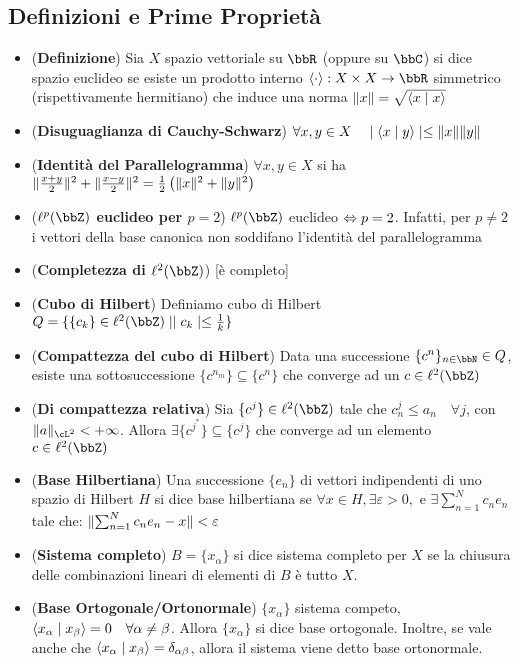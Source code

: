 \documentclass[a4paper,NoNotes,GeneralMath]{stdmdoc}
\newcommand{\cl}{\ell}
\begin{document}
        \subsection*{Definizioni e Prime Proprietà}
        \begin{itemize}
        \item ({\bf Definizione}) Sia $X$ spazio vettoriale su $\bbR$ (oppure su $\bbC$) si dice spazio euclideo se esiste un prodotto interno $\langle \cdot \rangle : X \times X \rar \bbR$ simmetrico (rispettivamente hermitiano) che induce una norma $\| {x} \| = \sqrt{\langle x \mid x \rangle}$
        \item ({\bf Disuguaglianza di Cauchy-Schwarz}) $\forall x, y \in X \quad \mid \langle x \mid y \rangle \mid \le \| {x} \| \| {y} \|$
        \item ({\bf Identità del Parallelogramma}) $\forall x, y \in X$ si ha $\| {\frac{x+y}{2}} \|^2 + \| {\frac{x-y}{2}} \|^2 = \frac{1}{2} \left( \| {x} \|^2 + \| {y} \|^2 \right)$
        \item ({\bf $\cl^p(\bbZ)$ euclideo per $p = 2$}) $\cl^p(\bbZ)$ euclideo $\Leftrightarrow p = 2$. Infatti, per $p \neq 2$ i vettori della base canonica non soddifano l'identità del parallelogramma
        \item ({\bf Completezza di $\cl^2(\bbZ)$}) [è completo]
        \item ({\bf Cubo di Hilbert}) Definiamo cubo di Hilbert $Q = \{ \{c_k\} \in \cl^2(\bbZ) \mid \abs{c_k} \le \frac{1}{k} \}$
        \item ({\bf Compattezza del cubo di Hilbert}) Data una successione $\{ c^n \}_{n \in \bbN} \in Q$, esiste una sottosuccessione $\{ c^{n_m} \} \subseteq \{ c^n \}$ che converge ad un $c \in \cl^2(\bbZ)$
        \item ({\bf Di compattezza relativa}) Sia $\{ c^j \} \in \cl^2(\bbZ)$ tale che $c_n^j \le a_n \quad \forall j$, con $\norm{a}_{\cL^2} < +\infty$. Allora $\exists \{ c^{j^*} \} \subseteq \{ c^j \}$ che converge ad un elemento $c \in \cl^2(\bbZ)$
        \item ({\bf Base Hilbertiana}) Una successione $\{e_n\}$ di vettori indipendenti di uno spazio di Hilbert $H$ si dice base hilbertiana se $\forall x \in H, \exists \varepsilon > 0, \text{ e } \exists \sum_{n=1}^N c_n e_n$ tale che: $\| {\sum_{n=1}^N c_n e_n - x} \| < \varepsilon$
        \item ({\bf Sistema completo}) $B = \{ x_\alpha \}$ si dice sistema completo per $X$ se la chiusura delle combinazioni lineari di elementi di $B$ è tutto $X$.
        \item ({\bf Base Ortogonale/Ortonormale}) $\{x_\alpha\}$ sistema competo, $\langle x_\alpha \mid x_\beta \rangle = 0 \quad \forall \alpha \neq \beta$. Allora $\{x_\alpha\}$ si dice base ortogonale. Inoltre, se vale anche che $\langle x_\alpha \mid x_\beta \rangle = \delta_{\alpha\beta}$, allora il sistema viene detto base ortonormale.

\end{itemize}
\end{document}
